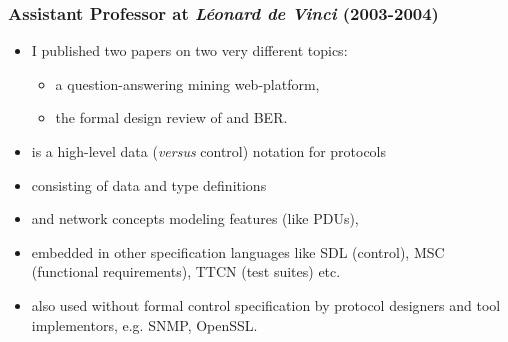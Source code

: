 \documentclass[compress,dvips,xcolor={dvipsnames},t]{beamer}
\begin{document}
%
\begin{frame}
\frametitle{Assistant Professor at \emph{Léonard de Vinci} (2003-2004)}

\begin{itemize}

  \item I published two papers on two very different topics:

  \begin{itemize}

    \item a question-answering mining web-platform,

    \item the formal design review of \ASN and BER.

  \end{itemize}

  \item \ASN is a high-level data (\emph{versus} control) notation for
  protocols

  \item consisting of data and type definitions

  \item and network concepts modeling features (like PDUs),

  \item embedded in other specification languages like SDL (control),
  MSC (functional requirements), TTCN (test suites) etc.

  \item also used without formal control specification by protocol
  designers and tool implementors, e.g. SNMP, OpenSSL.

\end{itemize}

\end{frame}
\end{document}

